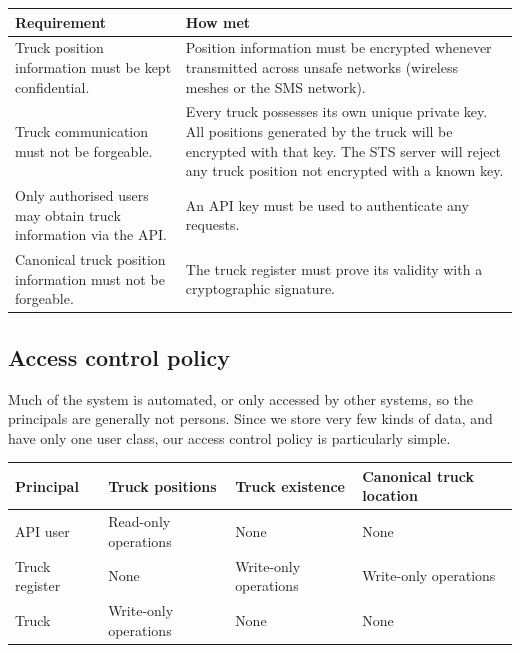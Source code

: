 \documentclass[a4paper,11pt]{report}
\begin{document}
\begin{center}
  \begin{tabular}[h!]{| p{} | p{} |}
    \hline
    \rowcolor{gray}
    Requirement & How met \\
    \hline
    \hline
    Truck position information must be kept confidential. &
    Position information must be encrypted whenever transmitted across unsafe networks (wireless meshes or the SMS network).
    \\
    \hline
    Truck communication must not be forgeable. &
    Every truck possesses its own unique private key.  All positions generated by the truck will be encrypted with that key.  The STS server will reject any truck position not encrypted with a known key. \\
    \hline
    Only authorised users may obtain truck information via the API. &
    An API key must be used to authenticate any requests.
    \\
    \hline
    Canonical truck position information must not be forgeable. &
    The truck register must prove its validity with a cryptographic signature.
    \\
    \hline
 \end{tabular}
\end{center}

\subsection{Access control policy}
\label{sec:acp}

Much of the system is automated, or only accessed by other systems, so
the principals are generally not persons.  Since we store very few
kinds of data, and have only one user class, our access control policy
is particularly simple.

\begin{center}
  \begin{tabular}[h!]{|p{}|p{}|p{}|p{}|}
    \hline
    \rowcolor{gray}
    Principal & Truck positions & Truck existence & Canonical truck location \\
    \hline
    \hline
    API user & Read-only operations & None & None \\
    \hline
    Truck register & None & Write-only operations & Write-only operations \\
    \hline
    Truck & Write-only operations & None & None \\
    \hline
  \end{tabular}
\end{center}
\end{document}
